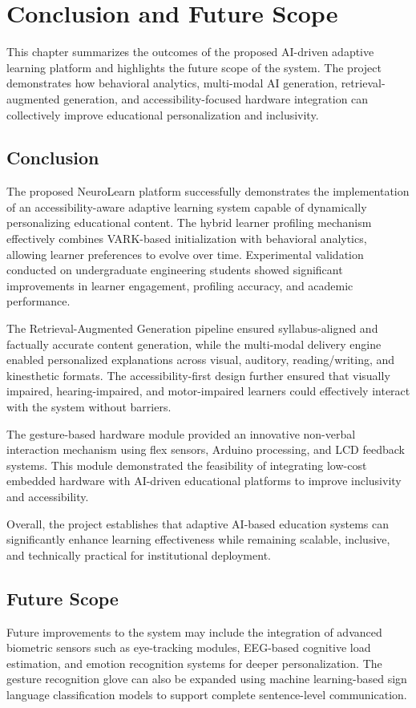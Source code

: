 \chapter{Conclusion and Future Scope}
This chapter summarizes the outcomes of the proposed AI-driven adaptive learning platform and highlights the future scope of the system. The project demonstrates how behavioral analytics, multi-modal AI generation, retrieval-augmented generation, and accessibility-focused hardware integration can collectively improve educational personalization and inclusivity.

\section{Conclusion}
The proposed NeuroLearn platform successfully demonstrates the implementation of an accessibility-aware adaptive learning system capable of dynamically personalizing educational content. The hybrid learner profiling mechanism effectively combines VARK-based initialization with behavioral analytics, allowing learner preferences to evolve over time. Experimental validation conducted on undergraduate engineering students showed significant improvements in learner engagement, profiling accuracy, and academic performance.

The Retrieval-Augmented Generation pipeline ensured syllabus-aligned and factually accurate content generation, while the multi-modal delivery engine enabled personalized explanations across visual, auditory, reading/writing, and kinesthetic formats. The accessibility-first design further ensured that visually impaired, hearing-impaired, and motor-impaired learners could effectively interact with the system without barriers.

The gesture-based hardware module provided an innovative non-verbal interaction mechanism using flex sensors, Arduino processing, and LCD feedback systems. This module demonstrated the feasibility of integrating low-cost embedded hardware with AI-driven educational platforms to improve inclusivity and accessibility.

Overall, the project establishes that adaptive AI-based education systems can significantly enhance learning effectiveness while remaining scalable, inclusive, and technically practical for institutional deployment.


\section{Future Scope}
Future improvements to the system may include the integration of advanced biometric sensors such as eye-tracking modules, EEG-based cognitive load estimation, and emotion recognition systems for deeper personalization. The gesture recognition glove can also be expanded using machine learning-based sign language classification models to support complete sentence-level communication.


